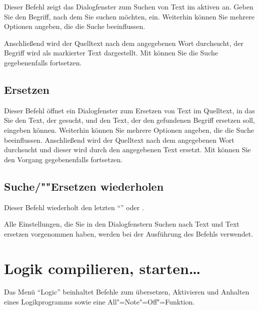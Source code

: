 Dieser Befehl zeigt das Dialogfenster zum Suchen von Text im 
aktiven  an. Geben Sie den Begriff, 
nach dem Sie suchen möchten, ein. Weiterhin können Sie mehrere 
Optionen angeben, die die Suche beeinflussen.


Anschließend wird der Quelltext nach dem angegebenen Wort durchsucht,
der Begriff wird als markierter Text dargestellt. Mit
 können Sie die Suche
gegebenenfalls fortsetzen.


\subsection{Ersetzen}\label{sec:MI_REPLACE}

Dieser Befehl öffnet ein Dialogfenster zum Ersetzen von Text 
im Quelltext, in das Sie den Text, der gesucht, und den Text, 
der den gefundenen Begriff ersetzen soll, eingeben können. 
Weiterhin können Sie mehrere Optionen angeben, die die Suche 
beeinflussen. Anschließend wird der Quelltext nach dem angegebenen 
Wort durchsucht und dieser wird durch den angegebenen Text ersetzt. 
Mit  können Sie den 
Vorgang gegebenenfalls fortsetzen.

\subsection{Suche/""Ersetzen wiederholen}
\label{sec:MI_NEXT}

Dieser Befehl wiederholt den letzten "`"'
oder .



Alle Einstellungen, die Sie in den Dialogfenstern Suchen nach 
Text und Text ersetzen vorgenommen haben, werden bei der Ausführung 
des Befehls verwendet. 


\section{Logik compilieren, starten\dots}\label{sec:MS_LOGIC}

Das Menü "`Logic"' beinhaltet Befehle zum übersetzen, Aktivieren 
und Anhalten eines Logikprogramms sowie eine All"=Note"=Off"=Funktion.


